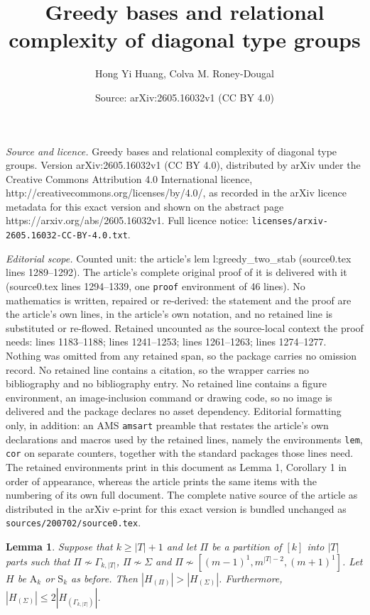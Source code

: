 \documentclass[10pt,a4paper]{amsart}
\title{Greedy bases and relational complexity of diagonal type groups}
\author{Hong Yi Huang, Colva M. Roney-Dougal}
\date{Source: arXiv:2605.16032v1 (CC BY 4.0)}
\newtheorem{lem}{Lemma}
\newcommand{\An}{\mathrm{A}}
\newcommand{\Sn}{\mathrm{S}}
\def\ge{\geqs}
\newcommand{\geqs}{\geqslant}
\newcommand{\leqs}{\leqslant}
\newcommand{\minPart}{\Gamma_{k, |T|}}
\begin{document}
\maketitle

\noindent\emph{Source and licence.} Greedy bases and relational complexity of diagonal type groups. Version arXiv:2605.16032v1 (CC BY 4.0), distributed by arXiv under the Creative Commons Attribution 4.0 International licence, http://creativecommons.org/licenses/by/4.0/, as recorded in the arXiv licence metadata for this exact version and shown on the abstract page https://arxiv.org/abs/2605.16032v1. Full licence notice: \texttt{licenses/arxiv-2605.16032-CC-BY-4.0.txt}.\par\smallskip

\noindent\textit{Editorial scope.} Counted unit: the article's lem l:greedy\_two\_stab (source0.tex lines 1289--1292). The article's complete original proof of it is delivered with it (source0.tex lines 1294--1339, one \texttt{proof} environment of 46 lines). No mathematics is written, repaired or re-derived: the statement and the proof are the article's own lines, in the article's own notation, and no retained line is substituted or re-flowed.  Retained uncounted as the source-local context the proof needs: lines 1183--1188; lines 1241--1253; lines 1261--1263; lines 1274--1277.  Nothing was omitted from any retained span, so the package carries no omission record.  No retained line contains a citation, so the wrapper carries no bibliography and no bibliography entry.  No retained line contains a figure environment, an image-inclusion command or drawing code, so no image is delivered and the package declares no asset dependency.  Editorial formatting only, in addition: an AMS \texttt{amsart} preamble that restates the article's own declarations and macros used by the retained lines, namely the environments \texttt{lem}, \texttt{cor} on separate counters, together with the standard packages those lines need.  The retained environments print in this document as Lemma 1, Corollary 1 in order of appearance, whereas the article prints the same items with the numbering of its own full document.  The complete native source of the article as distributed in the arXiv e-print for this exact version is bundled unchanged as \texttt{sources/200702/source0.tex}.
\begin{lem}
	\label{l:part}
	Suppose that $k \ge |T| + 1$ and  let $\Pi$ be a partition of $[k]$ into $|T|$ %
    parts such that $\Pi \not\sim \minPart$,  $\Pi \not\sim \Sigma$ and $\Pi \not \sim [(m-1)^1, m^{|T|-2}, (m+1)^{1}]$.  Let $H$ be $\An_k$ or $\Sn_k$ as before. Then $|H_{(\Pi)}| > |H_{(\Sigma)}|$. Furthermore, $|H_{(\Sigma)}| \leqs 2|H_{(\minPart)}|$.
\end{lem}
\end{document}
